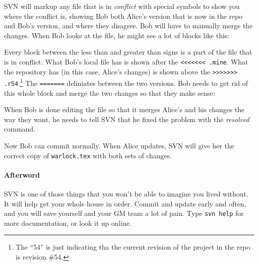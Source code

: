 \documentclass[green]{testgame}
\begin{document}

SVN will markup any file that is in {\em conflict} with special
symbols to show you where the conflict is, showing Bob both Alice's
version that is now in the repo and Bob's version, and where they
disagree. Bob will have to manually merge the changes. When Bob looks
at the file, he might see a lot of blocks like this:


Every block between the less than and greater than signs is a part of
the file that is in conflict. What Bob's local file has is shown after
the {\tt <<<<<<< .mine}. What the repository has (in this case,
Alice's changes) is shown above the {\tt >>>>>>> .r54}.\footnote{The
``54'' is just indicating tha the current revision of the project in
the repo is revision \#54.} The {\tt =======} deliniates between the
two versions. Bob needs to get rid of this whole block and merge the
two changes so that they make sense:


When Bob is done editing the file so that it merges Alice's and his
changes the way they want, he needs to tell SVN that he fixed the
problem with the {\em resolved} command.


Now Bob can commit normally. When Alice updates, SVN will give her the
correct copy of {\tt warlock.tex} with both sets of changes.

\paragraph*{Afterword}

SVN is one of those things that you won't be able to imagine you lived
without. It will help get your whole house in order. Commit and update
early and often, and you will save yourself and your GM team a lot of
pain. Type {\tt svn help} for more documentation, or look it up
online.
\end{document}
